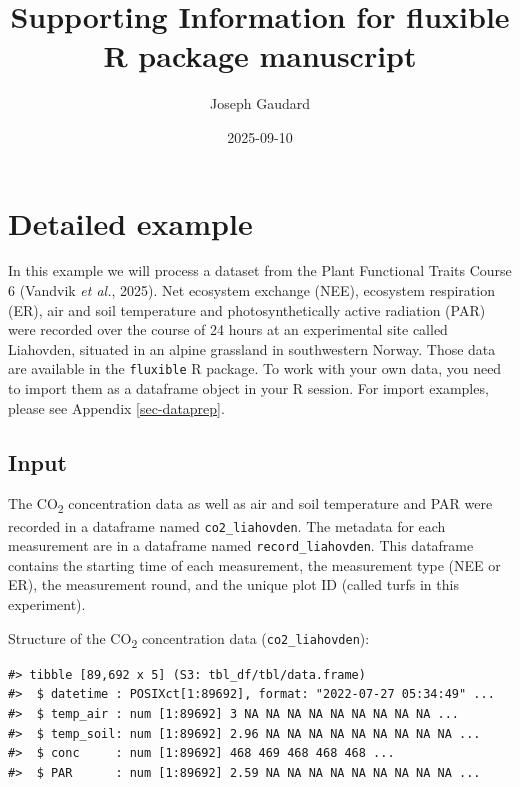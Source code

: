 \documentclass[
  letterpaper,
  DIV=11,
  numbers=noendperiod]{scrartcl}
\title{Supporting Information for fluxible R package manuscript}
\author{Joseph Gaudard}
\date{2025-09-10}
\begin{document}
\maketitle


\appendix
\renewcommand{\thefigure}{A\arabic{figure}}
\renewcommand{\thetable}{A\arabic{table}}
\setcounter{figure}{0}
\setcounter{table}{0}

\section{Detailed example}\label{sec-example}

In this example we will process a dataset from the Plant Functional
Traits Course 6 (Vandvik \emph{et al.}, 2025). Net ecosystem exchange
(NEE), ecosystem respiration (ER), air and soil temperature and
photosynthetically active radiation (PAR) were recorded over the course
of 24 hours at an experimental site called Liahovden, situated in an
alpine grassland in southwestern Norway. Those data are available in the
\texttt{fluxible} R package. To work with your own data, you need to
import them as a dataframe object in your R session. For import
examples, please see Appendix \ref{sec-dataprep}.

\subsection{Input}\label{input}

The CO\textsubscript{2} concentration data as well as air and soil
temperature and PAR were recorded in a dataframe named
\texttt{co2\_liahovden}. The metadata for each measurement are in a
dataframe named \texttt{record\_liahovden}. This dataframe contains the
starting time of each measurement, the measurement type (NEE or ER), the
measurement round, and the unique plot ID (called turfs in this
experiment).

Structure of the CO\textsubscript{2} concentration data
(\texttt{co2\_liahovden}):

\begin{verbatim}
#> tibble [89,692 x 5] (S3: tbl_df/tbl/data.frame)
#>  $ datetime : POSIXct[1:89692], format: "2022-07-27 05:34:49" ...
#>  $ temp_air : num [1:89692] 3 NA NA NA NA NA NA NA NA NA ...
#>  $ temp_soil: num [1:89692] 2.96 NA NA NA NA NA NA NA NA NA ...
#>  $ conc     : num [1:89692] 468 469 468 468 468 ...
#>  $ PAR      : num [1:89692] 2.59 NA NA NA NA NA NA NA NA NA ...
\end{verbatim}
\end{document}
